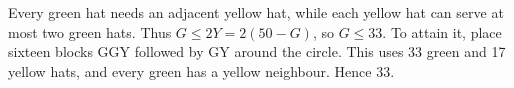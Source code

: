 Every green hat needs an adjacent yellow hat, while each yellow hat can serve at most two green hats. Thus $G\le2Y=2(50-G)$, so $G\le33$. To attain it, place sixteen blocks GGY followed by GY around the circle. This uses 33 green and 17 yellow hats, and every green has a yellow neighbour. Hence $\boxed{33}$.
